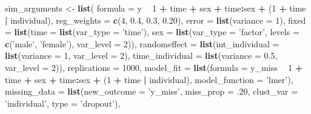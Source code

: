 \documentclass[man]{apa6}
\newenvironment{Shaded}{\begin{snugshade}}{\end{snugshade}}
\newcommand{\DataTypeTok}[1]{\textcolor[rgb]{0.13,0.29,0.53}{#1}}
\newcommand{\DecValTok}[1]{\textcolor[rgb]{0.00,0.00,0.81}{#1}}
\newcommand{\FloatTok}[1]{\textcolor[rgb]{0.00,0.00,0.81}{#1}}
\newcommand{\KeywordTok}[1]{\textcolor[rgb]{0.13,0.29,0.53}{\textbf{#1}}}
\newcommand{\NormalTok}[1]{#1}
\newcommand{\OperatorTok}[1]{\textcolor[rgb]{0.81,0.36,0.00}{\textbf{#1}}}
\newcommand{\StringTok}[1]{\textcolor[rgb]{0.31,0.60,0.02}{#1}}
\begin{document}
\begin{Shaded}
\begin{Highlighting}[]
\NormalTok{sim_arguments <-}\StringTok{ }\KeywordTok{list}\NormalTok{(}
  \DataTypeTok{formula =}\NormalTok{ y }\OperatorTok{~}\StringTok{ }\DecValTok{1} \OperatorTok{+}\StringTok{ }\NormalTok{time }\OperatorTok{+}\StringTok{ }\NormalTok{sex }\OperatorTok{+}\StringTok{ }\NormalTok{time}\OperatorTok{:}\NormalTok{sex }\OperatorTok{+}\StringTok{ }\NormalTok{(}\DecValTok{1} \OperatorTok{+}\StringTok{ }\NormalTok{time }\OperatorTok{|}\StringTok{ }\NormalTok{individual),}
  \DataTypeTok{reg_weights =} \KeywordTok{c}\NormalTok{(}\DecValTok{4}\NormalTok{, }\FloatTok{0.4}\NormalTok{, }\FloatTok{0.3}\NormalTok{, }\FloatTok{0.20}\NormalTok{),}
  \DataTypeTok{error =} \KeywordTok{list}\NormalTok{(}\DataTypeTok{variance =} \DecValTok{1}\NormalTok{),}
  \DataTypeTok{fixed =} \KeywordTok{list}\NormalTok{(}\DataTypeTok{time =} \KeywordTok{list}\NormalTok{(}\DataTypeTok{var_type =} \StringTok{'time'}\NormalTok{),}
               \DataTypeTok{sex =} \KeywordTok{list}\NormalTok{(}\DataTypeTok{var_type =} \StringTok{'factor'}\NormalTok{, }\DataTypeTok{levels =} \KeywordTok{c}\NormalTok{(}\StringTok{'male'}\NormalTok{, }\StringTok{'female'}\NormalTok{),}
                          \DataTypeTok{var_level =} \DecValTok{2}\NormalTok{)),}
  \DataTypeTok{randomeffect =} \KeywordTok{list}\NormalTok{(}\DataTypeTok{int_individual =} \KeywordTok{list}\NormalTok{(}\DataTypeTok{variance =} \DecValTok{1}\NormalTok{, }\DataTypeTok{var_level =} \DecValTok{2}\NormalTok{),}
                      \DataTypeTok{time_individual =} \KeywordTok{list}\NormalTok{(}\DataTypeTok{variance =} \FloatTok{0.5}\NormalTok{, }\DataTypeTok{var_level =} \DecValTok{2}\NormalTok{)),}
  \DataTypeTok{replications =} \DecValTok{1000}\NormalTok{,}
  \DataTypeTok{model_fit =} \KeywordTok{list}\NormalTok{(}\DataTypeTok{formula =}\NormalTok{ y_miss }\OperatorTok{~}\StringTok{ }\DecValTok{1} \OperatorTok{+}\StringTok{ }\NormalTok{time }\OperatorTok{+}\StringTok{ }\NormalTok{sex }\OperatorTok{+}\StringTok{ }\NormalTok{time}\OperatorTok{:}\NormalTok{sex }\OperatorTok{+}\StringTok{ }
\StringTok{                     }\NormalTok{(}\DecValTok{1} \OperatorTok{+}\StringTok{ }\NormalTok{time }\OperatorTok{|}\StringTok{ }\NormalTok{individual), }
                   \DataTypeTok{model_function =} \StringTok{'lmer'}\NormalTok{),}
  \DataTypeTok{missing_data =} \KeywordTok{list}\NormalTok{(}\DataTypeTok{new_outcome =} \StringTok{'y_miss'}\NormalTok{, }\DataTypeTok{miss_prop =} \FloatTok{.20}\NormalTok{,}
                      \DataTypeTok{clust_var =} \StringTok{'individual'}\NormalTok{, }\DataTypeTok{type =} \StringTok{'dropout'}\NormalTok{),}

\end{Highlighting}
\end{Shaded}
\end{document}
